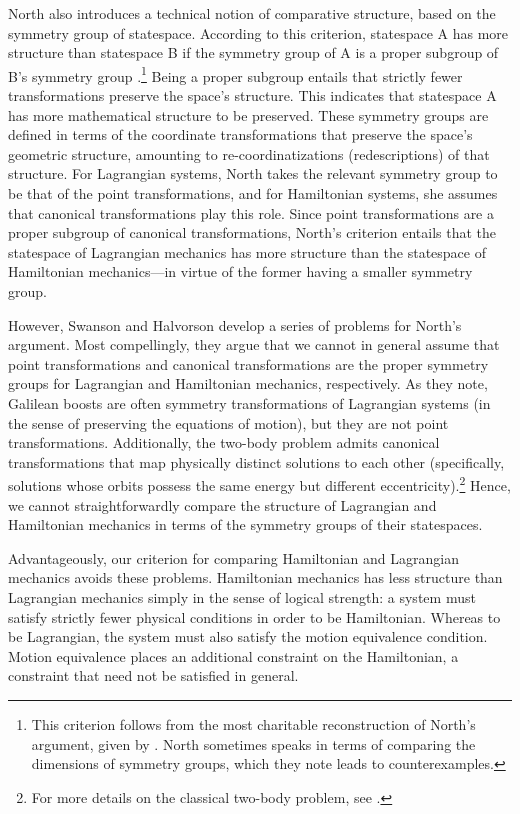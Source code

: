 \documentclass[12pt, english, twoside]{article} %
\begin{document}
North also introduces a technical notion of comparative structure, based on the symmetry group of statespace. According to this criterion, statespace A has more structure than statespace B if the symmetry group of A is a proper subgroup of B's symmetry group \parencites[87-88]{North}.\footnote{This criterion follows from the most charitable reconstruction of North's argument, given by \textcites[]{Swanson}. North sometimes speaks in terms of comparing the dimensions of symmetry groups, which they note leads to counterexamples.} Being a proper subgroup entails that strictly fewer transformations preserve the space's structure. This indicates that statespace A has more mathematical structure to be preserved. These symmetry groups are defined in terms of the coordinate transformations that preserve the space's geometric structure, amounting to re-coordinatizations (redescriptions) of that structure. For Lagrangian systems, North takes the relevant symmetry group to be that of the point transformations, and for Hamiltonian systems, she assumes that canonical transformations play this role. Since point transformations are a proper subgroup of canonical transformations, North's criterion entails that the statespace of Lagrangian mechanics has more structure than the statespace of Hamiltonian mechanics---in virtue of the former having a smaller symmetry group. 

However, Swanson and Halvorson \parencites*[]{Swanson} develop a series of problems for North's argument. Most compellingly, they argue that we cannot in general assume that point transformations and canonical transformations are the proper symmetry groups for Lagrangian and Hamiltonian mechanics, respectively. As they note, Galilean boosts are often symmetry transformations of Lagrangian systems (in the sense of preserving the equations of motion), but they are not point transformations. Additionally, the two-body problem admits canonical transformations that map physically distinct solutions to each other (specifically, solutions whose orbits possess the same energy but different eccentricity).\footnote{For more details on the classical two-body problem, see \textcites[]{Belot}.} Hence, we cannot straightforwardly compare the structure of Lagrangian and Hamiltonian mechanics in terms of the symmetry groups of their statespaces. 

Advantageously, our criterion for comparing Hamiltonian and Lagrangian mechanics avoids these problems. Hamiltonian mechanics has less structure than Lagrangian mechanics simply in the sense of logical strength: a system must satisfy strictly fewer physical conditions in order to be Hamiltonian. Whereas to be Lagrangian, the system must also satisfy the motion equivalence condition. Motion equivalence places an additional constraint on the Hamiltonian, a constraint that need not be satisfied in general. 
\end{document}
